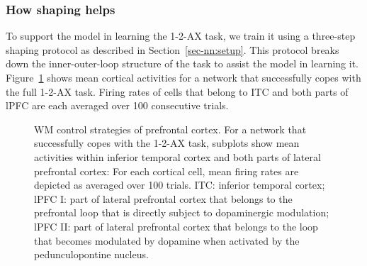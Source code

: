 \documentclass[
  11pt,
  a4paper,
]{scrbook}
\begin{document}
\subsubsection*{How shaping helps}\label{how-shaping-helps}

To support the model in learning the 1-2-AX task, we train it using a
three-step shaping protocol as described in Section~\ref{sec-nn:setup}.
This protocol breaks down the inner-outer-loop structure of the task to
assist the model in learning it. Figure~\ref{fig-nn:fig9} shows mean
cortical activities for a network that successfully copes with the full
1-2-AX task. Firing rates of cells that belong to ITC and both parts of
lPFC are each averaged over 100 consecutive trials.

\begin{figure}


\caption{\label{fig-nn:fig9}WM control strategies of prefrontal cortex.
For a network that successfully copes with the 1-2-AX task, subplots
show mean activities within inferior temporal cortex and both parts of
lateral prefrontal cortex: For each cortical cell, mean firing rates are
depicted as averaged over 100 trials. ITC: inferior temporal cortex;
lPFC I: part of lateral prefrontal cortex that belongs to the prefrontal
loop that is directly subject to dopaminergic modulation; lPFC II: part
of lateral prefrontal cortex that belongs to the loop that becomes
modulated by dopamine when activated by the pedunculopontine nucleus.}

\end{figure}%
\end{document}
